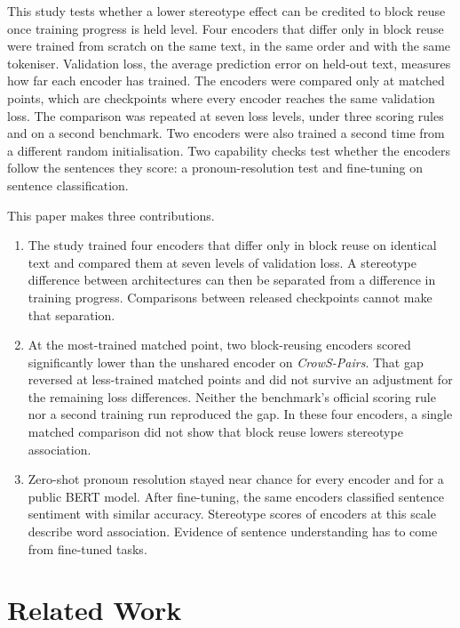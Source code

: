 \documentclass[sigconf,natbib=true]{acmart}
\begin{document}
This study tests whether a lower stereotype effect can be credited to block
reuse once training progress is held level. Four encoders that differ only in
block reuse were trained from scratch on the same text, in the same order and
with the same tokeniser. Validation loss, the average prediction error on
held-out text, measures how far each encoder has trained. The encoders were
compared only at matched points, which are checkpoints where every encoder
reaches the same validation loss. The comparison was repeated at seven loss
levels, under three scoring rules and on a second benchmark. Two encoders were
also trained a second time from a different random initialisation. Two
capability checks test whether the encoders follow the sentences they score: a
pronoun-resolution test and fine-tuning on sentence classification.

This paper makes three contributions.

\begin{enumerate}
\item The study trained four encoders that differ only in block reuse on
      identical text and compared them at seven levels of validation loss. A
      stereotype difference between architectures can then be separated from
      a difference in training progress. Comparisons between released
      checkpoints cannot make that separation.
\item At the most-trained matched point, two block-reusing encoders scored
      significantly lower than the unshared encoder on \emph{CrowS-Pairs}. That
      gap reversed at less-trained matched points and did not survive an
      adjustment for the remaining loss differences. Neither the benchmark's
      official scoring rule nor a second training run reproduced the gap. In
      these four encoders, a single matched comparison did not show that block
      reuse lowers stereotype association.
\item Zero-shot pronoun resolution stayed near chance for every encoder and for a
      public BERT model. After fine-tuning, the same encoders classified
      sentence sentiment with similar accuracy. Stereotype scores of encoders at
      this scale describe word association. Evidence of sentence understanding
      has to come from fine-tuned tasks.
\end{enumerate}

\section{Related Work}
\label{sec:related}
\end{document}
